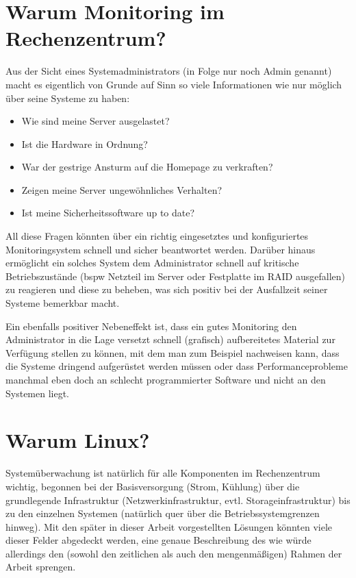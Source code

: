 \documentclass[12pt,a4paper,parskip,listof=totoc,bibliography=totoc]{scrreprt}
\begin{document}
	\section{Warum Monitoring im Rechenzentrum?}
	Aus der Sicht eines Systemadministrators (in Folge nur noch Admin genannt) macht es eigentlich von Grunde auf Sinn so viele Informationen wie nur möglich über seine Systeme zu haben:
	\begin{itemize}
		\item Wie sind meine Server ausgelastet?
		\item Ist die Hardware in Ordnung?
		\item War der gestrige Ansturm auf die Homepage zu verkraften?
		\item Zeigen meine Server ungewöhnliches Verhalten?
		\item Ist meine Sicherheitssoftware up to date?
	\end{itemize}
	  All diese Fragen könnten über ein richtig eingesetztes und konfiguriertes Monitoringsystem schnell und sicher beantwortet werden. Darüber hinaus ermöglicht ein solches System dem Administrator schnell auf kritische Betriebszustände (\acrlong{bspw} Netzteil im Server oder Festplatte im RAID ausgefallen) zu reagieren und diese zu beheben, was sich positiv bei der Ausfallzeit seiner Systeme bemerkbar macht. 
	  
	  Ein ebenfalls positiver Nebeneffekt ist, dass ein gutes Monitoring den Administrator in die Lage versetzt schnell (grafisch) aufbereitetes Material zur Verfügung stellen zu können, mit dem man zum Beispiel nachweisen kann, dass die Systeme dringend aufgerüstet werden müssen oder dass Performanceprobleme manchmal eben doch an schlecht programmierter Software und nicht an den Systemen liegt.
	  
	\section{Warum Linux?}
	Systemüberwachung ist natürlich für alle Komponenten im Rechenzentrum wichtig, begonnen bei der Basisversorgung (Strom, Kühlung) über die grundlegende Infrastruktur (Netzwerkinfrastruktur, evtl. Storageinfrastruktur) bis zu den einzelnen Systemen (natürlich quer über die Betriebssystemgrenzen hinweg). Mit den später in dieser Arbeit vorgestellten Lösungen könnten viele dieser Felder abgedeckt werden, eine genaue Beschreibung des wie würde allerdings den (sowohl den zeitlichen als auch den mengenmäßigen) Rahmen der Arbeit sprengen. 
	
\end{document}
